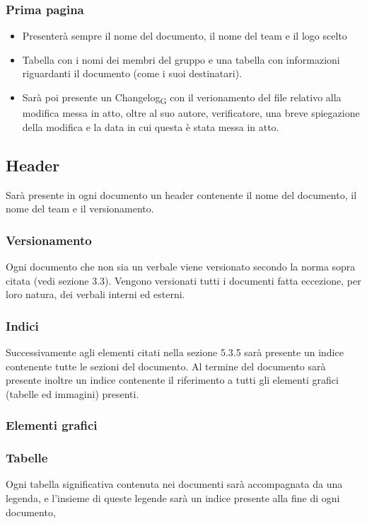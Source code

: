 \documentclass{article}
\begin{document}
\subsubsection*{Prima pagina}
\begin{itemize}
    \item Presenterà sempre il nome del documento, il nome del team e il logo scelto
    \item Tabella con i nomi dei membri del gruppo e una tabella con informazioni riguardanti il documento (come i suoi destinatari).
    \item Sarà poi presente un Changelog\textsubscript{G} con il verionamento del file relativo alla modifica messa in atto, oltre al suo autore, verificatore, una breve spiegazione della modifica e la data in cui questa è stata messa in atto.
\end{itemize}

\subsection{Header}
Sarà presente in ogni documento un header contenente il nome del documento, il nome del team e il versionamento.

\subsubsection*{Versionamento}
Ogni documento che non sia un verbale viene versionato secondo la norma sopra citata (vedi sezione 3.3). Vengono versionati tutti i documenti fatta eccezione, per loro natura, dei verbali interni ed esterni.
\subsubsection*{Indici}
Successivamente agli elementi citati nella sezione 5.3.5 sarà presente un indice contenente tutte le sezioni del documento. Al termine del documento sarà presente inoltre un indice contenente il riferimento a tutti gli elementi grafici (tabelle ed immagini) presenti. 

\subsubsection{Elementi grafici}
\subsubsection{Tabelle}
Ogni tabella significativa contenuta nei documenti sarà accompagnata da una legenda, e l'insieme di queste legende sarà un indice presente alla fine di ogni documento,
\end{document}
